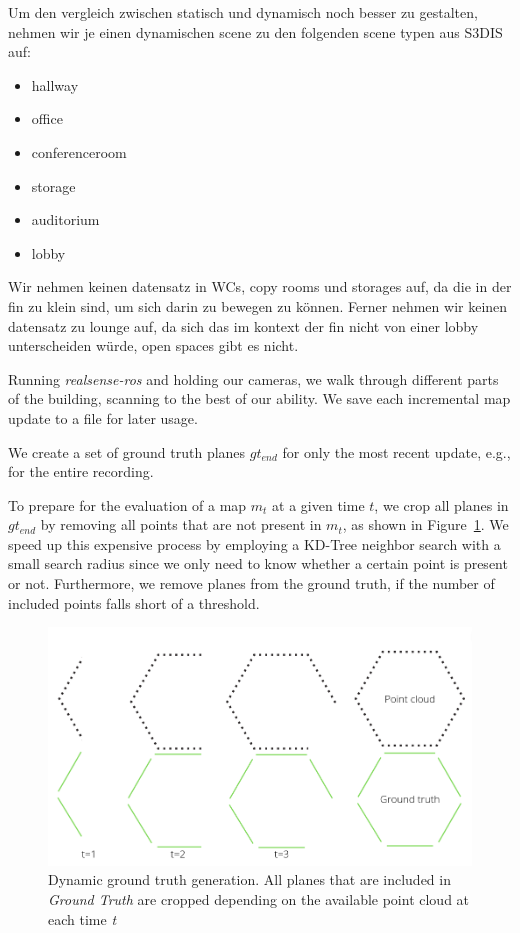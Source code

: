 \documentclass[main.tex]{subfiles}
\begin{document}
Um den vergleich zwischen statisch und dynamisch noch besser zu gestalten, nehmen wir je einen dynamischen scene zu den folgenden scene typen aus S3DIS auf:
\begin{itemize}
    \item hallway
    \item office
    \item conferenceroom
    \item storage
    \item auditorium
    \item lobby
\end{itemize}
Wir nehmen keinen datensatz in WCs, copy rooms und storages auf, da die in der fin zu klein sind, um sich darin zu bewegen zu können. Ferner nehmen wir keinen
datensatz zu lounge auf, da sich das im kontext der fin nicht von einer lobby unterscheiden würde, open spaces gibt es nicht.

Running \textit{realsense-ros} and holding our cameras, we walk through different parts of the building, scanning to the best of our ability.
We save each incremental map update to a file for later usage.

We create a set of ground truth planes $gt_{end}$ for only the most recent update, e.g., for the entire recording.

To prepare for the evaluation of a map $m_t$ at a given time $t$, we crop all planes in $gt_{end}$ by removing all points that are not present in $m_t$, as shown in
Figure~\ref{fig:dynGT}.
We speed up this expensive process by employing a KD-Tree neighbor search with a small search radius since we only need to know whether a certain point is present or not.
Furthermore, we remove planes from the ground truth, if the number of included points falls short of a threshold.

\begin{figure}[H]
    \centering
    \includegraphics[width=15 cm]{images/dynamic_eval.png}
    \caption[Dynamic Ground Truth Generation]{Dynamic ground truth generation. All planes that are included in \textit{Ground Truth} are cropped depending on
        the available point cloud at each time \textit{t} }
    \label{fig:dynGT}
\end{figure}
\end{document}
